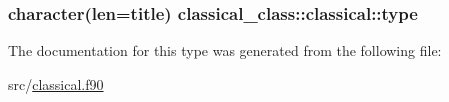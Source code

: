 \hypertarget{structclassical__class_1_1classical_a4c835c43f9359c512790ebce83387d63}{
\subsubsection[{type}]{\setlength{\rightskip}{0pt plus 5cm}character(len=title) classical\-\_\-class\-::classical\-::type\hspace{0.3cm}{\ttfamily [private]}}}\label{structclassical__class_1_1classical_a4c835c43f9359c512790ebce83387d63}


The documentation for this type was generated from the following file\-:\begin{DoxyCompactItemize}
\item 
src/\hyperlink{classical_8f90}{classical.\-f90}\end{DoxyCompactItemize}
